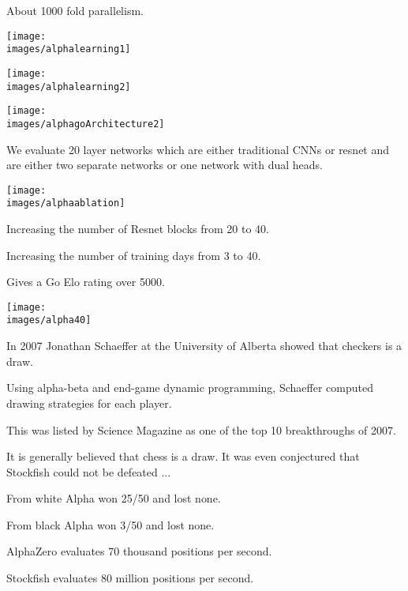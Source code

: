 {\vfill
About 1000 fold parallelism.


\centerline{\texttt{[image: \\images/alphalearning1]}}


\centerline{\texttt{[image: \\images/alphalearning2]}}


\centerline{\texttt{[image: \\images/alphagoArchitecture2]}}

\vfill
We evaluate 20 layer networks which are either traditional CNNs or resnet and are either two separate networks or one network with dual heads.


\centerline{\texttt{[image: \\images/alphaablation]}}


Increasing the number of Resnet blocks from 20 to 40.

\vfill
Increasing the number of training days from 3 to 40.

\vfill
Gives a Go Elo rating over 5000.


\centerline{\texttt{[image: \\images/alpha40]}}


In 2007 Jonathan Schaeffer at the University of Alberta showed that checkers is a draw.

\vfill
Using alpha-beta and end-game dynamic programming, Schaeffer computed drawing strategies for each player.

\vfill
This was listed by Science Magazine as one of the top 10 breakthroughs of 2007.

\vfill
It is generally believed that chess is a draw.  It was even conjectured that Stockfish could not be defeated ...


From white Alpha won 25/50 and lost none.

\vfill
From black Alpha won 3/50 and lost none.

\vfill
AlphaZero evaluates 70 thousand positions per second.

\vfill
Stockfish evaluates 80 million positions per second.

}
